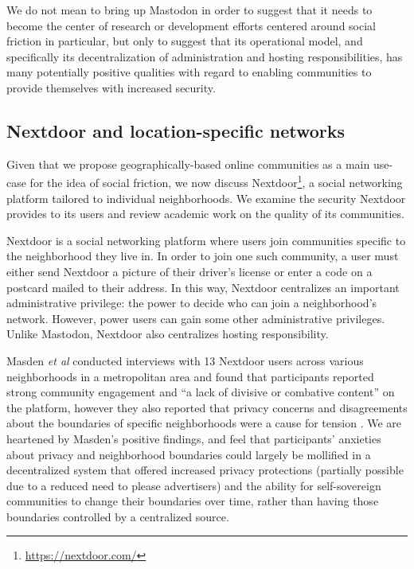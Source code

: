 \documentclass[sigconf,authordraft]{acmart}
\begin{document}
We do not mean to bring up Mastodon in order to suggest that it needs to become the center of research or development efforts centered around social friction in particular, but only to suggest that its operational model, and specifically its decentralization of administration and hosting responsibilities, has many potentially positive qualities with regard to enabling communities to provide themselves with increased security.

\subsection{Nextdoor and location-specific networks}

Given that we propose geographically-based online communities as a main use-case for the idea of social friction, we now discuss  Nextdoor\footnote{\url{https://nextdoor.com/}}, a social networking platform tailored to individual neighborhoods. We examine the security Nextdoor provides to its users and review academic work on the quality of its communities.

Nextdoor is a social networking platform where users join communities specific to the neighborhood they live in. In order to join one such community, a user must either send Nextdoor a picture of their driver's license or enter a code on a postcard mailed to their address. In this way, Nextdoor centralizes an important administrative privilege: the power to decide who can join a neighborhood's network. However, power users can gain some other administrative privileges. Unlike Mastodon, Nextdoor also centralizes hosting responsibility.

Masden {\itshape et al} conducted interviews with 13 Nextdoor users across various neighborhoods in a metropolitan area and found that participants reported strong community engagement and ``a lack of divisive or combative content'' on the platform, however they also reported that privacy concerns and disagreements about the boundaries of specific neighborhoods were a cause for tension \cite{masden2014tensions}. We are heartened by Masden's positive findings, and feel that participants' anxieties about privacy and neighborhood boundaries could largely be mollified in a decentralized system that offered increased privacy protections (partially possible due to a reduced need to please advertisers) and the ability for self-sovereign communities to change their boundaries over time, rather than having those boundaries controlled by a centralized source.
\end{document}
